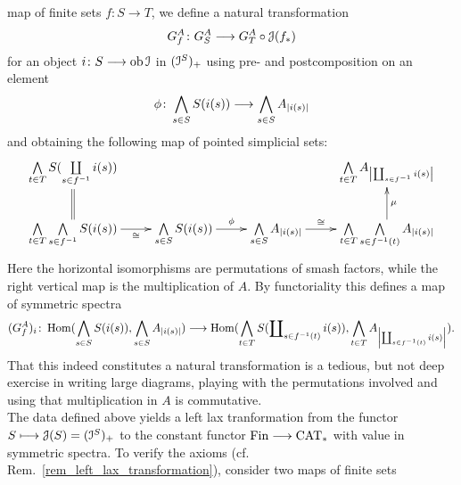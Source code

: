 \begin{defn}
      map of finite sets $f \colon S \to T$, we define a natural transformation
      \begin{displaymath}
        G^A_f \colon G^A_S \longrightarrow G^A_T \circ \mathcal{J}(f_*)
      \end{displaymath}
      for an object $i \colon S \longrightarrow \operatorname{ob} \mathcal{I}$ in $(\mathcal{I}^S)_+$ using pre- and postcomposition on an element
      \begin{displaymath}
        \phi \colon \bigwedge_{s \in S} S(i(s)) \longrightarrow \bigwedge_{s \in S} A_{\left\vert i(s)\right\vert}
      \end{displaymath}
      and obtaining the following map of pointed simplicial sets:
      \begin{displaymath}
        \xymatrix{
          \bigwedge\limits_{t \in T} S(\coprod\limits_{s \in f^{-1}} i(s)) &&&
          \bigwedge\limits_{t \in T} A_{\abs{\coprod_{s \in f^{-1}} i(s)}}
          \\
          \bigwedge\limits_{t \in T} \bigwedge\limits_{s \in f^{-1}} S(i(s))
            \ar@{=}[u]
            \ar[r]_-{\cong}
          &
          \bigwedge\limits_{s \in S} S(i(s))
            \ar[r]^-{\phi}
          &
          \bigwedge\limits_{s \in S} A_{\abs{i(s)}}
            \ar[r]^-{\cong}
          &
          \bigwedge\limits_{t \in T} \bigwedge\limits_{s \in f^{-1}(t)} A_{\abs{i(s)}}
            \ar[u]_-{\mu}
        }
      \end{displaymath}
      Here the horizontal isomorphisms are permutations of smash factors, while
      the right vertical map is the multiplication of $A$. By functoriality this
      defines a map of symmetric spectra
      \begin{displaymath}
        (G^A_f)_i \colon \Hom(\bigwedge_{s \in S} S(i(s)), \bigwedge_{s \in S} A_{\abs{i(s)}}) \to %
        \Hom(\bigwedge_{t \in T} S(\coprod\nolimits_{s \in f^{-1}(t)} i(s)), %
          \bigwedge_{t \in T} A_{\abs{ \coprod_{s \in f^{-1}(t)} i(s)}}).
      \end{displaymath}
      That this indeed constitutes a natural transformation is a tedious, but
      not deep exercise in writing large diagrams, playing with the permutations
      involved and using that multiplication in $A$ is commutative.\\ The data
      defined above yields a left lax tranformation from the functor $S \longmapsto
      \mathcal{J}(S) = (\mathcal{I}^S)_+$ to the constant functor $\mathrm{Fin} \longrightarrow \mathrm{CAT}_*$ with value
      in symmetric spectra.  To verify the axioms (cf.
      Rem.~\ref{rem_left_lax_transformation}), consider two maps of finite sets

\end{defn}
